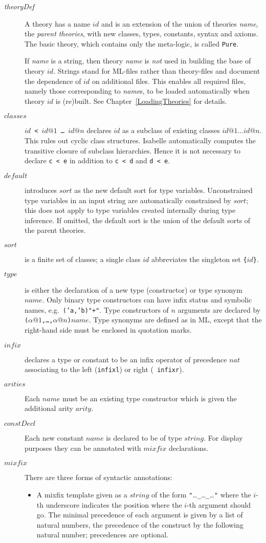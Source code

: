 \begin{description} 
\item[{\it theoryDef}] A theory has a name $id$ and is an extension of the
  union of theories {\it name}, the {\em parent theories}, with new classes,
  types, constants, syntax and axioms.  The basic theory, which contains only
  the meta-logic, is called {\tt Pure}.

  If {\it name} is a string, then theory {\it name} is {\em not} used in
  building the base of theory $id$. Strings stand for ML-files rather than
  theory-files and document the dependence of $id$ on additional files. This
  enables all required files, namely those corresponding to {\it name}s, to
  be loaded automatically when theory $id$ is (re)built. See
  Chapter~\ref{LoadingTheories} for details.
\item[$classes$] {\tt$id$ < $id@1$ \dots\ $id@n$} declares $id$ as a subclass
  of existing classes $id@1\dots id@n$.  This rules out cyclic class
  structures.  Isabelle automatically computes the transitive closure of
  subclass hierarchies.  Hence it is not necessary to declare {\tt c < e} in
  addition to {\tt c < d} and {\tt d < e}.
\item[$default$] introduces $sort$ as the new default sort for type
  variables.  Unconstrained type variables in an input string are
  automatically constrained by $sort$; this does not apply to type variables
  created internally during type inference.  If omitted, the default sort is
  the union of the default sorts of the parent theories.
\item[$sort$] is a finite set of classes; a single class $id$ abbreviates the
  singleton set {\tt\{}$id${\tt\}}.
\item[$type$] is either the declaration of a new type (constructor) or type
  synonym $name$. Only binary type constructors can have infix status and
  symbolic names, e.g.\ {\tt ('a,'b)"+"}. Type constructors of $n$ arguments
  are declared by {\tt ($\alpha@1$,\dots,$\alpha@n$)$name$}.  Type
  synonyms are defined as in ML, except that the
  right-hand side must be enclosed in quotation marks.
\item[$infix$] declares a type or constant to be an infix operator of
  precedence $nat$ associating to the left ({\tt infixl}) or right ({\tt
    infixr}).
\item[$arities$] Each $name$ must be an existing type constructor which is
  given the additional arity $arity$.
\item[$constDecl$] Each new constant $name$ is declared to be of type
  $string$.  For display purposes they can be annotated with $mixfix$
  declarations.
\item[$mixfix$] There are three forms of syntactic annotations:
  \begin{itemize}
  \item A mixfix template given as a $string$ of the form
    {\tt"}\dots{\tt\_}\dots{\tt\_}\dots{\tt"} where the $i$-th underscore
    indicates the position where the $i$-th argument should go. The minimal
    precedence of each argument is given by a list of natural numbers, the
    precedence of the construct by the following natural number; precedences
    are optional.


\end{itemize}
\end{description}
